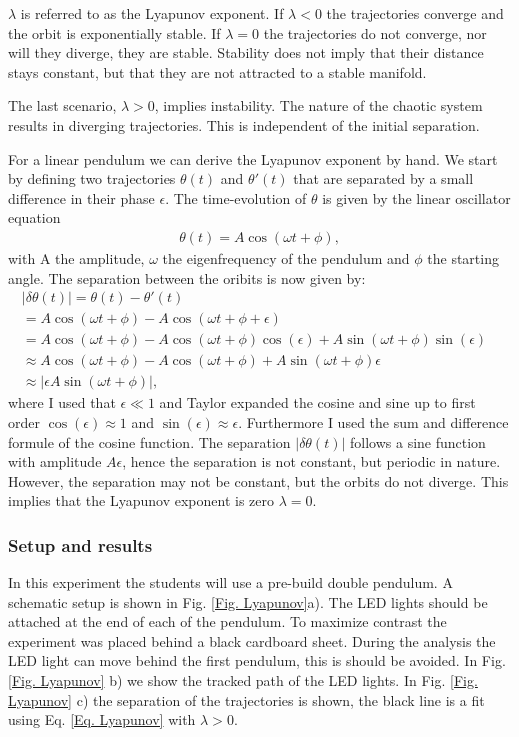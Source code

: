 \documentclass{article}
\begin{document}
$\lambda$ is referred to as the Lyapunov exponent. If $\lambda < 0 $ the trajectories converge and the orbit is exponentially stable. If $\lambda = 0$ the trajectories do not converge, nor will they diverge, they are stable. Stability does not imply that their distance stays constant, but that they are not attracted to a stable manifold.

The last scenario, $\lambda>0$, implies instability. The nature of the chaotic system results in diverging trajectories. This is independent of the initial separation.

For a linear pendulum we can derive the Lyapunov exponent by hand. We start by defining two trajectories $\theta(t)$ and $\theta'(t)$ that are separated by a small difference in their phase $\epsilon$. The time-evolution of $\theta$ is given by the linear oscillator equation
\begin{align}
    \theta(t) =A\cos(\omega t + \phi),
\end{align}
with A the amplitude, $\omega$ the eigenfrequency of the pendulum and $\phi$ the starting angle. The separation between the oribits is now given by:
\begin{align}
    |\delta \theta(t)| = \theta(t)-\theta'(t) & \\
    = A\cos(\omega t + \phi) - A\cos(\omega t +\phi +\epsilon) & \\
    = A\cos(\omega t + \phi) - A\cos(\omega t +\phi)\cos(\epsilon) +A\sin(\omega t +\phi)\sin(\epsilon) & \\
    \approx A\cos(\omega t + \phi) - A\cos(\omega t +\phi) +A\sin(\omega t +\phi)\epsilon & \\
    \approx  |\epsilon A \sin(\omega t + \phi)|,
\end{align}
where I used that $\epsilon \ll 1 $ and Taylor expanded the cosine and sine up to first order $\cos(\epsilon)\approx1$ and $\sin(\epsilon)\approx\epsilon$. Furthermore I used the sum and difference formule of the cosine function. The separation $|\delta\theta(t)|$ follows a sine function with amplitude $A\epsilon$, hence the separation is not constant, but periodic in nature. However, the separation may not be constant, but the orbits do not diverge. This implies that the Lyapunov exponent is zero $\lambda =0$. 

\subsubsection{Setup and results}
In this experiment the students will use a pre-build double pendulum. A schematic setup is shown in Fig. \ref{Fig. Lyapunov}a). The LED lights should be attached at the end of each of the pendulum. To maximize contrast the experiment was placed behind a black cardboard sheet. During the analysis the LED light can move behind the first pendulum, this is should be avoided. In Fig. \ref{Fig. Lyapunov} b) we show the tracked path of the LED lights. In Fig. \ref{Fig. Lyapunov} c) the separation of the trajectories is shown, the black line is a fit using Eq. \ref{Eq. Lyapunov} with $\lambda>0$. 
\end{document}
